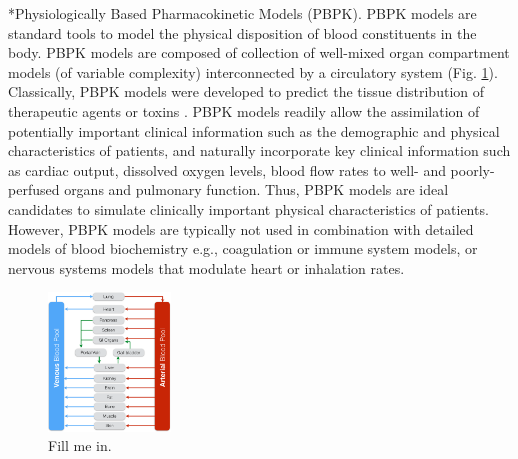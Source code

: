 \documentclass[11pt]{article}
\makeatletter
\renewcommand\subsection{\@startsection
	{subsection}{2}{0mm}
	{-0.05in}
	{-0.5\baselineskip}
	{\normalfont\normalsize\bfseries}}
\makeatother
\begin{document}
\subsection*{Physiologically Based Pharmacokinetic Models (PBPK).}
PBPK models are standard tools to model the physical disposition of blood constituents in the body.
PBPK models are composed of collection of well-mixed organ compartment models (of variable complexity) interconnected by a circulatory system (Fig. \ref{fig:SamplePBPK}).
Classically, PBPK models were developed to predict the tissue distribution of therapeutic agents or toxins \cite{Gerlowski:1983aa}.
PBPK models readily allow the assimilation of potentially important clinical information such as the demographic and physical characteristics of patients,
and naturally incorporate key clinical information such as cardiac output,
dissolved oxygen levels, blood flow rates to well- and poorly-perfused organs and pulmonary function.
Thus, PBPK models are ideal candidates to simulate clinically important physical characteristics of patients.
However, PBPK models are typically not used in combination with detailed models of blood biochemistry e.g., coagulation or immune system models, or nervous systems models that modulate heart or inhalation rates.


\begin{figure}
  \includegraphics[width=0.29\textwidth]{./figs/PBPK-Figure-7-31-14.pdf}
  \caption{Fill me in.}\label{fig:SamplePBPK}
\end{figure}
\end{document}
